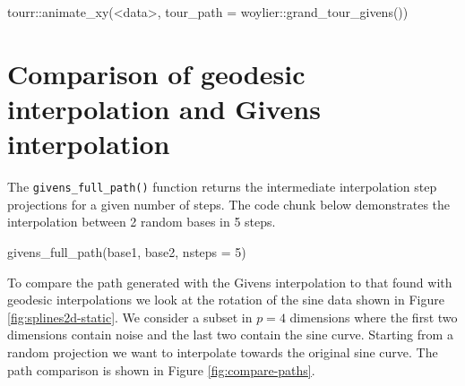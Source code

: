 \begin{Schunk}
\begin{Sinput}
tourr::animate_xy(<data>, tour_path = woylier::grand_tour_givens())
\end{Sinput}
\end{Schunk}

\hypertarget{comparison-of-geodesic-interpolation-and-givens-interpolation}{%
\section{Comparison of geodesic interpolation and Givens
interpolation}\label{comparison-of-geodesic-interpolation-and-givens-interpolation}}

The \texttt{givens\_full\_path()} function returns the intermediate
interpolation step projections for a given number of steps. The code
chunk below demonstrates the interpolation between 2 random bases in 5
steps.

\begin{Schunk}
\begin{Sinput}
givens_full_path(base1, base2, nsteps = 5)
\end{Sinput}
\end{Schunk}

To compare the path generated with the Givens interpolation to that
found with geodesic interpolations we look at the rotation of the sine
data shown in Figure \ref{fig:splines2d-static}. We consider a subset in
\(p=4\) dimensions where the first two dimensions contain noise and the
last two contain the sine curve. Starting from a random projection we
want to interpolate towards the original sine curve. The path comparison
is shown in Figure \ref{fig:compare-paths}.


